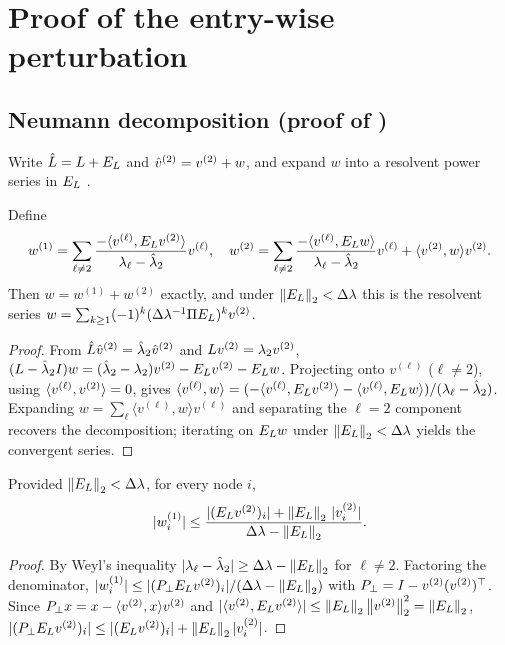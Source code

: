\section{Proof of the entry-wise perturbation}\label{app:comp3}

\subsection{Neumann decomposition (proof of )}\label{app:comp3a}

Write $\hat L=L+E_{L}$ and $\hat v^{(2)}=v^{(2)}+w$, and expand $w$ into a resolvent power series
in $E_{L}$ \cite{eldridge2017unperturbed}.

\begin{lemma}\label{lem:C-series}
Define
\[
   w^{(1)}=\sum_{\ell\ne2}\frac{-\langle v^{(\ell)},E_{L}v^{(2)}\rangle}
        {\lambda_\ell-\hat\lambda_2}v^{(\ell)},
   \quad
   w^{(2)}=\sum_{\ell\ne2}\frac{-\langle v^{(\ell)},E_{L} w\rangle}
        {\lambda_\ell-\hat\lambda_2}v^{(\ell)}+\langle v^{(2)},w\rangle v^{(2)}.
\]
Then $w=w^{(1)}+w^{(2)}$ exactly, and under $\left\lVert E_{L} \right\rVert_{2}<\Delta\lambda$ this is the
resolvent series $w=\sum_{k\ge1}(-1)^k(\Delta\lambda^{-1}\Pi E_{L})^kv^{(2)}$.
\end{lemma}
\begin{proof}
From $\hat L\hat v^{(2)}=\hat\lambda_2\hat v^{(2)}$ and $Lv^{(2)}=\lambda_2v^{(2)}$,
$(L-\hat\lambda_2I)w=(\hat\lambda_2-\lambda_2)v^{(2)}-E_{L}v^{(2)}-E_{L} w$. Projecting onto
$v^{(\ell)}$ ($\ell\ne2$), using $\langle v^{(\ell)},v^{(2)}\rangle=0$, gives
$\langle v^{(\ell)},w\rangle=(-\langle v^{(\ell)},E_{L}v^{(2)}\rangle-\langle
v^{(\ell)},E_{L} w\rangle)/(\lambda_\ell-\hat\lambda_2)$. Expanding
$w=\sum_\ell\langle v^{(\ell)},w\rangle v^{(\ell)}$ and separating the $\ell=2$
component recovers the decomposition; iterating on $E_{L} w$ under $\left\lVert E_{L} \right\rVert_{2}<\Delta\lambda$
yields the convergent series.
\end{proof}

\begin{lemma}\label{lem:C-first}
Provided $\left\lVert E_{L} \right\rVert_{2}<\Delta\lambda$, for every node $i$,
\begin{equation}
   |w^{(1)}_i|\le\frac{|(E_{L}v^{(2)})_i|+\left\lVert E_{L} \right\rVert_{2}\,|v^{(2)}_i|}{\Delta\lambda-\left\lVert E_{L} \right\rVert_{2}}.
\end{equation}
\end{lemma}
\begin{proof}
By Weyl's inequality $|\lambda_\ell-\hat\lambda_2|\ge\Delta\lambda-\left\lVert E_{L} \right\rVert_{2}$ for
$\ell\ne2$. Factoring the denominator,
$|w^{(1)}_i|\le|(P_\perp E_{L}v^{(2)})_i|/(\Delta\lambda-\left\lVert E_{L} \right\rVert_{2})$ with
$P_\perp=I-v^{(2)}(v^{(2)})^\top$. Since $P_\perp x=x-\langle v^{(2)},x\rangle v^{(2)}$ and
$|\langle v^{(2)},E_{L}v^{(2)}\rangle|\le\left\lVert E_{L} \right\rVert_{2}\left\lVert v^{(2)} \right\rVert_2^2=\left\lVert E_{L} \right\rVert_{2}$,
$|(P_\perp E_{L}v^{(2)})_i|\le|(E_{L}v^{(2)})_i|+\left\lVert E_{L} \right\rVert_{2}|v^{(2)}_i|$.
\end{proof}


